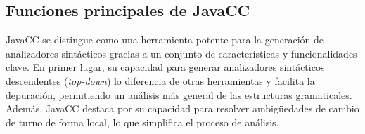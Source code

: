 \subsection{Funciones principales de JavaCC}




\noindent JavaCC se distingue como una herramienta potente para la generación de analizadores sintácticos gracias a un conjunto de características y funcionalidades clave. En primer lugar, su capacidad para generar analizadores sintácticos descendentes (\textit{top-down}) lo diferencia de otras herramientas y facilita la depuración, permitiendo un análisis más general de las estructuras gramaticales. Además, JavaCC destaca por su capacidad para resolver ambigüedades de cambio de turno de forma local, lo que simplifica el proceso de análisis.

